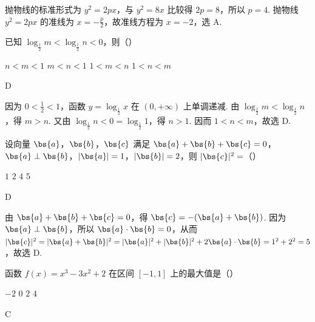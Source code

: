 \begin{solution}
抛物线的标准形式为 \(y^2=2px\)，与 \(y^2=8x\) 比较得 \(2p=8\)，所以 \(p=4\). 抛物线 \(y^2=2px\) 的准线为 \(x=-\frac p2\)，故准线方程为 \(x=-2\)，选 A.
\end{solution}

\begin{problem}
已知 \(\log_{\frac{1}{2}} m < \log_{\frac{1}{2}} n < 0\)，则（\quad）

\choices
    {\(n < m < 1\)}
    {\(m < n < 1\)}
    {\(1 < m < n\)}
    {\(1 < n < m\)}
\end{problem}

\begin{answer}
D
\end{answer}

\begin{solution}
因为 \(0<\frac12<1\)，函数 \(y=\log_{\frac12}x\) 在 \((0,+\infty)\) 上单调递减. 由 \(\log_{\frac12}m<\log_{\frac12}n\)，得 \(m>n\). 又由 \(\log_{\frac12}n<0=\log_{\frac12}1\)，得 \(n>1\). 因而 \(1<n<m\)，故选 D.
\end{solution}

\begin{problem}
设向量 \(\bs{a}\)，\(\bs{b}\)，\(\bs{c}\) 满足 \(\bs{a} + \bs{b} + \bs{c} = 0\)，\(\bs{a} \perp \bs{b}\)，\(|\bs{a}| = 1\)，\(|\bs{b}| = 2\)，则 \(|\bs{c}|^2 =\)（\quad）

\choices
    {\(1\)}
    {\(2\)}
    {\(4\)}
    {\(5\)}
\end{problem}

\begin{answer}
D
\end{answer}

\begin{solution}
由 \(\bs{a}+\bs{b}+\bs{c}=0\)，得 \(\bs{c}=-(\bs{a}+\bs{b})\). 因为 \(\bs{a}\perp\bs{b}\)，所以 \(\bs{a}\cdot\bs{b}=0\)，从而
\(\lvert\bs{c}\rvert^2=\lvert\bs{a}+\bs{b}\rvert^2=\lvert\bs{a}\rvert^2+\lvert\bs{b}\rvert^2+2\bs{a}\cdot\bs{b}=1^2+2^2=5\)，故选 D.
\end{solution}

\begin{problem}
函数 \( f(x) = x^3 - 3x^2 + 2 \) 在区间 \([-1, 1]\) 上的最大值是（\quad）

\choices
    {\(-2\)}
    {\(0\)}
    {\(2\)}
    {\(4\)}
\end{problem}

\begin{answer}
C
\end{answer}

